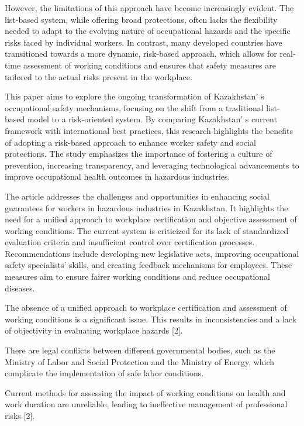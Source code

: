 However, the limitations of this approach have become increasingly
evident. The list-based system, while offering broad protections, often
lacks the flexibility needed to adapt to the evolving nature of
occupational hazards and the specific risks faced by individual workers.
In contrast, many developed countries have transitioned towards a more
dynamic, risk-based approach, which allows for real-time assessment of
working conditions and ensures that safety measures are tailored to the
actual risks present in the workplace.

This paper aims to explore the ongoing transformation of
Kazakhstan' s occupational safety mechanisms, focusing on
the shift from a traditional list-based model to a risk-oriented system.
By comparing Kazakhstan' s current framework with
international best practices, this research highlights the benefits of
adopting a risk-based approach to enhance worker safety and social
protections. The study emphasizes the importance of fostering a culture
of prevention, increasing transparency, and leveraging technological
advancements to improve occupational health outcomes in hazardous
industries.

The article addresses the challenges and opportunities in enhancing
social guarantees for workers in hazardous industries in Kazakhstan. It
highlights the need for a unified approach to workplace certification
and objective assessment of working conditions. The current system is
criticized for its lack of standardized evaluation criteria and
insufficient control over certification processes. Recommendations
include developing new legislative acts, improving occupational safety
specialists'{} skills, and creating feedback mechanisms
for employees. These measures aim to ensure fairer working conditions
and reduce occupational diseases.

The absence of a unified approach to workplace certification and
assessment of working conditions is a significant issue. This results in
inconsistencies and a lack of objectivity in evaluating workplace
hazards {[}2{]}.

There are legal conflicts between different governmental bodies, such as
the Ministry of Labor and Social Protection and the Ministry of Energy,
which complicate the implementation of safe labor conditions.

Current methods for assessing the impact of working conditions on health
and work duration are unreliable, leading to ineffective management of
professional risks {[}2{]}.

